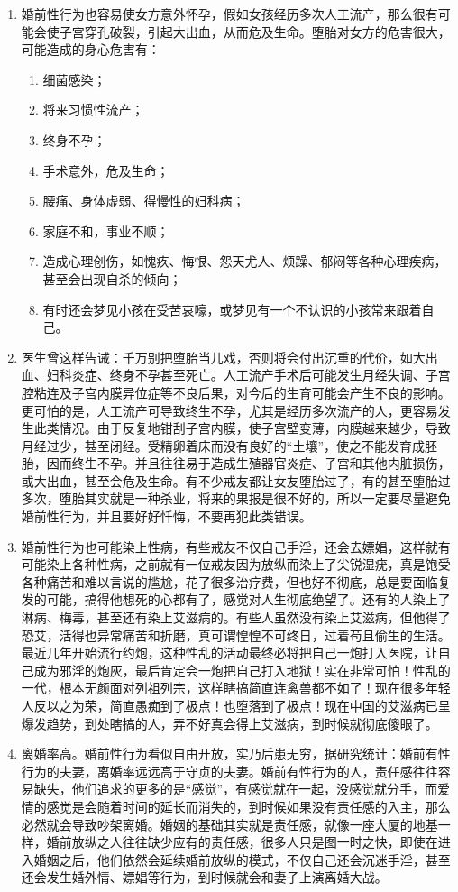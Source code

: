 \documentclass{ctexart}
\begin{document}
\begin{enumerate}
    \item 婚前性行为也容易使女方意外怀孕，假如女孩经历多次人工流产，那么很有可能会使子宫穿孔破裂，引起大出血，从而危及生命。堕胎对女方的危害很大，可能造成的身心危害有：\begin{enumerate}
              \item 细菌感染；
              \item 将来习惯性流产；
              \item 终身不孕；
              \item 手术意外，危及生命；
              \item 腰痛、身体虚弱、得慢性的妇科病；
              \item 家庭不和，事业不顺；
              \item 造成心理创伤，如愧疚、悔恨、怨天尤人、烦躁、郁闷等各种心理疾病，甚至会出现自杀的倾向；
              \item 有时还会梦见小孩在受苦哀嚎，或梦见有一个不认识的小孩常来跟着自己。
          \end{enumerate}
    \item 医生曾这样告诫：千万别把堕胎当儿戏，否则将会付出沉重的代价，如大出血、妇科炎症、终身不孕甚至死亡。人工流产手术后可能发生月经失调、子宫腔粘连及子宫内膜异位症等不良后果，对今后的生育可能会产生不良的影响。更可怕的是，人工流产可导致终生不孕，尤其是经历多次流产的人，更容易发生此类情况。由于反复地钳刮子宫内膜，使子宫壁变薄，内膜越来越少，导致月经过少，甚至闭经。受精卵着床而没有良好的“土壤”，使之不能发育成胚胎，因而终生不孕。并且往往易于造成生殖器官炎症、子宫和其他内脏损伤，或大出血，甚至会危及生命。有不少戒友都让女友堕胎过了，有的甚至堕胎过多次，堕胎其实就是一种杀业，将来的果报是很不好的，所以一定要尽量避免婚前性行为，并且要好好忏悔，不要再犯此类错误。
    \item 婚前性行为也可能染上性病，有些戒友不仅自己手淫，还会去嫖娼，这样就有可能染上各种性病，之前就有一位戒友因为放纵而染上了尖锐湿疣，真是饱受各种痛苦和难以言说的尴尬，花了很多治疗费，但也好不彻底，总是要面临复发的可能，搞得他想死的心都有了，感觉对人生彻底绝望了。还有的人染上了淋病、梅毒，甚至还有染上艾滋病的。有些人虽然没有染上艾滋病，但他得了恐艾，活得也异常痛苦和折磨，真可谓惶惶不可终日，过着苟且偷生的生活。最近几年开始流行约炮，这种性乱的活动最终必将把自己一炮打入医院，让自己成为邪淫的炮灰，最后肯定会一炮把自己打入地狱！实在非常可怕！性乱的一代，根本无颜面对列祖列宗，这样瞎搞简直连禽兽都不如了！现在很多年轻人反以之为荣，简直愚痴到了极点！也堕落到了极点！现在中国的艾滋病已呈爆发趋势，到处瞎搞的人，弄不好真会得上艾滋病，到时候就彻底傻眼了。
    \item 离婚率高。婚前性行为看似自由开放，实乃后患无穷，据研究统计：婚前有性行为的夫妻，离婚率远远高于守贞的夫妻。婚前有性行为的人，责任感往往容易缺失，他们追求的更多的是“感觉”，有感觉就在一起，没感觉就分手，而爱情的感觉是会随着时间的延长而消失的，到时候如果没有责任感的入主，那么必然就会导致吵架离婚。婚姻的基础其实就是责任感，就像一座大厦的地基一样，婚前放纵之人往往缺少应有的责任感，很多人只是图一时之快，即使在进入婚姻之后，他们依然会延续婚前放纵的模式，不仅自己还会沉迷手淫，甚至还会发生婚外情、嫖娼等行为，到时候就会和妻子上演离婚大战。
\end{enumerate}
\end{document}
